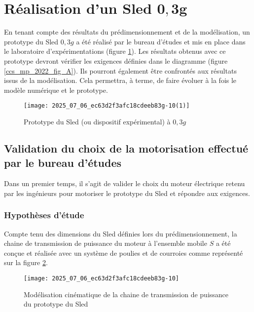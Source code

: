
\section{Réalisation d'un Sled $\mathbf{0 , 3 g}$ \label{ccs_mp_2022_sec_4}}

\ifprof
\else
En tenant compte des résultats du prédimensionnement et de la modélisation, un prototype du Sled $0,3 g$ a été réalisé par le bureau d'études et mis en place dans le laboratoire d'expérimentations (figure \ref{ccs_mp_2022_fig_13}). Les résultats obtenus avec ce prototype devront vérifier les exigences définies dans le diagramme (figure \ref{ccs_mp_2022_fig_A}). Ils pourront également être confrontés aux résultats issus de la modélisation. Cela permettra, à terme, de faire évoluer à la fois le modèle numérique et le prototype.\\


\begin{figure}[!h]
\centering
\texttt{[image: 2025\_07\_06\_ec63d2f3afc18cdeeb83g-10(1)]}

\caption{\label{ccs_mp_2022_fig_13}Prototype du Sled (ou dispositif expérimental) à $0,3 g$}
\end{figure}
\fi

\subsection{Validation du choix de la motorisation effectué par le bureau d'études \label{ccs_mp_2022_sec_4A}}

\ifprof
\else
\begin{obj}
Dans un premier temps, il s'agit de valider le choix du moteur électrique retenu par les ingénieurs pour motoriser le prototype du Sled et répondre aux exigences.
\end{obj}

\subsubsection*{Hypothèses d'étude}
Compte tenu des dimensions du Sled définies lors du prédimensionnement, la chaine de transmission de puissance du moteur à l'ensemble mobile $S$ a été conçue et réalisée avec un système de poulies et de courroies comme représenté sur la figure \ref{ccs_mp_2022_fig_14}.

\begin{figure}[!h]
\centering
\texttt{[image: 2025\_07\_06\_ec63d2f3afc18cdeeb83g-10]}

\caption{\label{ccs_mp_2022_fig_14}Modélisation cinématique de la chaine de transmission de puissance du prototype du Sled}
\end{figure}

